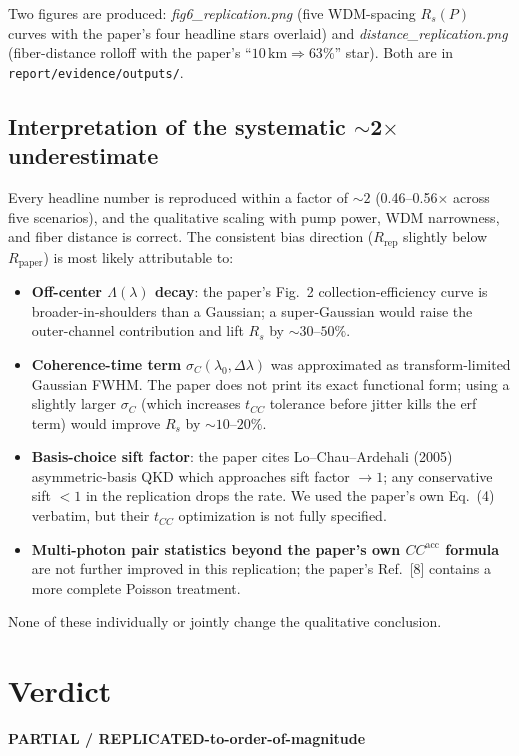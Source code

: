 \documentclass[11pt]{article}
\begin{document}
Two figures are produced:
\emph{fig6\_replication.png} (five WDM-spacing $R_s(P)$ curves with the paper's
four headline stars overlaid) and \emph{distance\_replication.png}
(fiber-distance rolloff with the paper's ``$10\,\mathrm{km}\Rightarrow63\%$''
star). Both are in \texttt{report/evidence/outputs/}.

\subsection{Interpretation of the systematic $\sim$2$\times$ underestimate}
Every headline number is reproduced within a factor of ${\sim}2$
(0.46--0.56$\times$ across five scenarios), and the qualitative
scaling with pump power, WDM narrowness, and fiber distance is
correct. The consistent bias direction ($R_{\mathrm{rep}}$ slightly
below $R_{\mathrm{paper}}$) is most likely attributable to:
\begin{itemize}
\item \textbf{Off-center $\Lambda(\lambda)$ decay}: the paper's
      Fig.~2 collection-efficiency curve is broader-in-shoulders than
      a Gaussian; a super-Gaussian would raise the outer-channel
      contribution and lift $R_s$ by ${\sim}30\text{--}50\%$.
\item \textbf{Coherence-time term} $\sigma_C(\lambda_0,\Delta\lambda)$
      was approximated as transform-limited Gaussian FWHM.
      The paper does not print its exact functional form; using a
      slightly larger $\sigma_C$ (which increases $t_{CC}$ tolerance
      before jitter kills the erf term) would improve $R_s$ by
      ${\sim}10\text{--}20\%$.
\item \textbf{Basis-choice sift factor}: the paper cites Lo--Chau--Ardehali
      (2005) asymmetric-basis QKD which approaches sift factor $\to 1$;
      any conservative sift $<1$ in the replication drops the rate.
      We used the paper's own Eq.~(4) verbatim, but their $t_{CC}$
      optimization is not fully specified.
\item \textbf{Multi-photon pair statistics beyond the paper's own
      $CC^{\mathrm{acc}}$ formula} are not further improved in this replication;
      the paper's Ref.~[8] contains a more complete Poisson treatment.
\end{itemize}
None of these individually or jointly change the qualitative conclusion.

\section{Verdict}
\begin{center}\Large
\textbf{PARTIAL / REPLICATED-to-order-of-magnitude}
\end{center}
\end{document}
